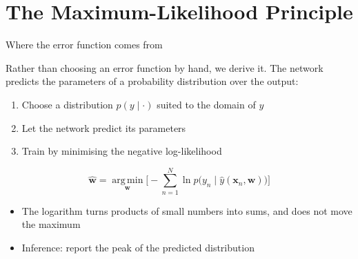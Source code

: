 \documentclass[aspectratio=169, 11pt]{beamer}
\newcommand{\src}[3]{}      %
\begin{document}
\section{The Maximum-Likelihood Principle}

\begin{frame}{Where the error function comes from}
  \src{prince2023}{equation}{5.6}
  \src{prince2023}{section}{5.2}
  \src{prince2023}{section}{5.1}
  \vspace{0.2em}
  Rather than choosing an error function by hand, we \alert{derive}
  it. The network predicts the parameters of a probability
  distribution over the output:
  \vfill
  \begin{enumerate}\setlength{\itemsep}{4pt}
    \item Choose a distribution $p(y\mid\cdot)$ suited to the
          \alert{domain of $y$}
    \item Let the network predict its parameters
    \item Train by minimising the \alert{negative log-likelihood}
  \end{enumerate}
  \vfill
  \[
    \hat{\mathbf{w}} = \operatorname*{arg\,min}_{\mathbf{w}}
    \Big[-\sum_{n=1}^{N}
    \ln p\big(y_n \mid \hat y(\mathbf{x}_n,\mathbf{w})\big)\Big]
  \]
  \vfill
  {\footnotesize
  \begin{itemize}\setlength{\itemsep}{2pt}
    \item The logarithm turns products of small numbers into sums,
          and does not move the maximum
    \item Inference: report the \alert{peak} of the predicted
          distribution
  \end{itemize}}
\end{frame}
\end{document}
